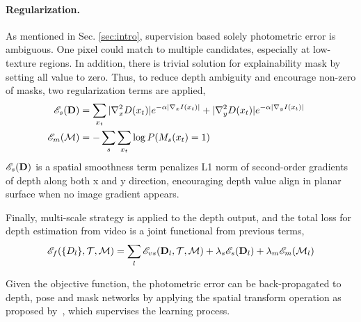 \paragraph{Regularization.} 
As mentioned in Sec. \ref{sec:intro}, supervision based solely photometric error is ambiguous. One pixel could match to multiple candidates, especially at low-texture regions. In addition, there is trivial solution for explainability mask by setting all value to zero. Thus, to reduce depth ambiguity and encourage non-zero of masks, two regularization terms are applied, 
\begin{align}
\label{eqn:regular}
{\mathscr E}_{s}({\mathbf D}) &= \sum_{x_t}|\nabla^{2}_xD(x_t)|e^{-\alpha|\nabla_xI(x_t)|} + |\nabla^{2}_yD(x_t)|e^{-\alpha|\nabla_yI(x_t)|}& \\
{\mathscr E}_{m}({\mathcal M}) &= -\sum_s\sum_{x_t}\log P(M_s(x_t) = 1) &
\end{align}
${\mathscr E}_{s}({\mathbf D})$ is a spatial smoothness term penalizes L1 norm of second-order gradients of depth along both x and y direction, encouraging depth value align in planar surface when no image gradient appears.

Finally, multi-scale strategy is applied to the depth output, and the total loss for depth estimation from video is a joint functional from previous terms,
\begin{align}
\label{eqn:full}
{\mathscr E}_{f}(\{D_l\}, {\mathcal T}, {\mathcal M}) = \sum_l{{\mathscr E}_{vs}({\mathbf D}_l,{\mathcal T},{\mathcal M}) + \lambda_s{\mathscr E}_{s}({\mathbf D}_l) + \lambda_m{\mathscr E}_{m}({\mathcal M}_l)}
\end{align}

Given the objective function, the photometric error can be back-propagated to depth, pose and mask networks by applying the spatial transform operation as proposed by~\cite{jaderberg2015spatial}, which supervises the learning process.

